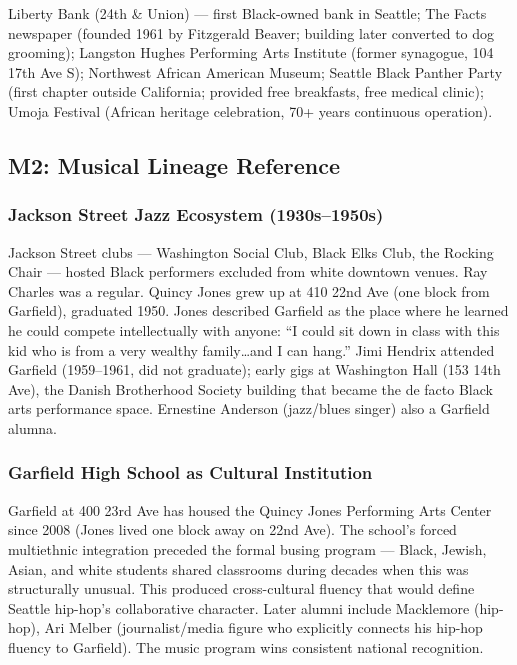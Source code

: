 \documentclass[11pt,letterpaper]{article}
\begin{document}
Liberty Bank (24th \& Union) --- first Black-owned bank in Seattle; The Facts newspaper (founded 1961 by Fitzgerald Beaver; building later converted to dog grooming); Langston Hughes Performing Arts Institute (former synagogue, 104 17th Ave S); Northwest African American Museum; Seattle Black Panther Party (first chapter outside California; provided free breakfasts, free medical clinic); Umoja Festival (African heritage celebration, 70+ years continuous operation).

\subsection{M2: Musical Lineage Reference}

\subsubsection{Jackson Street Jazz Ecosystem (1930s--1950s)}

Jackson Street clubs --- Washington Social Club, Black Elks Club, the Rocking Chair --- hosted Black performers excluded from white downtown venues. Ray Charles was a regular. Quincy Jones grew up at 410 22nd Ave (one block from Garfield), graduated 1950. Jones described Garfield as the place where he learned he could compete intellectually with anyone: ``I could sit down in class with this kid who is from a very wealthy family\ldots and I can hang.'' Jimi Hendrix attended Garfield (1959--1961, did not graduate); early gigs at Washington Hall (153 14th Ave), the Danish Brotherhood Society building that became the de facto Black arts performance space. Ernestine Anderson (jazz/blues singer) also a Garfield alumna.

\subsubsection{Garfield High School as Cultural Institution}

Garfield at 400 23rd Ave has housed the Quincy Jones Performing Arts Center since 2008 (Jones lived one block away on 22nd Ave). The school's forced multiethnic integration preceded the formal busing program --- Black, Jewish, Asian, and white students shared classrooms during decades when this was structurally unusual. This produced cross-cultural fluency that would define Seattle hip-hop's collaborative character. Later alumni include Macklemore (hip-hop), Ari Melber (journalist/media figure who explicitly connects his hip-hop fluency to Garfield). The music program wins consistent national recognition.
\end{document}
